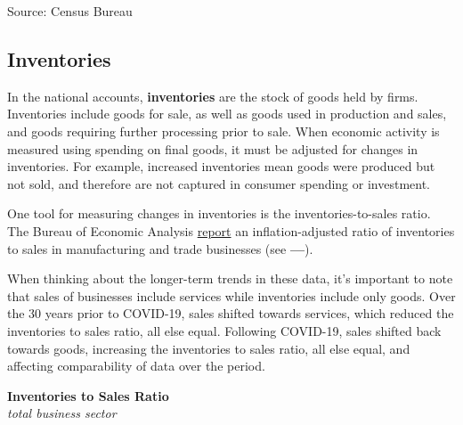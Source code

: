 \documentclass{report}
\makeatletter
\newcommand{\tbllink}[1]{\href{https://raw.githubusercontent.com/bdecon/US-chartbook/master/chartbook/data/#1}{\faTable}}
\newcommand*\short[1]{\expandafter\@gobbletwo\number\numexpr#1\relax}
\newcommand{\shdateaxisticks}{
		date coordinates in=x, axis line style={draw=none},
		xmax={2023-11-01},
		max space between ticks=40,	    
		xtick={{1990-01-01}, {1995-01-01}, {2000-01-01}, 
			{2005-01-01}, {2010-01-01}, {2015-01-01}, {2020-01-01}},
		minor xtick={},
		enlarge y limits={0.06}, enlarge x limits={0.01},
		}
\newcommand{\bbar}[2]{extra #1 ticks = {{#2}}, extra #1 tick labels = ,
		extra #1 tick style = {grid=major, grid style={thick, black!25}},}
\newcommand{\thickline}[4]{\addplot[ultra thick, no markers, color=#1] 
		table [x=#2, y=#3, col sep=comma] {#4};	}
\newcommand{\rebars}{
		\fill[color=black!10] (axis cs:{2007-12-01},\pgfkeysvalueof{/pgfplots/ymin}) rectangle 
			(axis cs:{2009-07-01}, \pgfkeysvalueof{/pgfplots/ymax});
		\fill[color=black!10] (axis cs:{2001-03-01},\pgfkeysvalueof{/pgfplots/ymin}) rectangle 
			(axis cs:{2001-11-01}, \pgfkeysvalueof{/pgfplots/ymax});
		\fill[color=black!10] (axis cs:{2020-02-01},\pgfkeysvalueof{/pgfplots/ymin}) rectangle 
			(axis cs:{2020-05-01}, \pgfkeysvalueof{/pgfplots/ymax});}
\makeatother
\begin{document}
{\begin{minipage}{0.4\textwidth}
\hspace{2mm} 

\footnotesize{Source: Census Bureau} \hfill \tbllink{dgno.csv} \ 
\end{minipage}
\vspace{10mm}

\begin{minipage}{0.76\textwidth}  
\subsection*{Inventories} 
\small In the national accounts, \textbf{inventories} are the stock of goods held by firms. Inventories include goods for sale, as well as goods used in production and sales, and goods requiring further processing prior to sale. When economic activity is measured using spending on final goods, it must be adjusted for changes in inventories. For example, increased inventories mean goods were produced but not sold, and therefore are not captured in consumer spending or investment. 

One tool for measuring changes in inventories is the inventories-to-sales ratio. The Bureau of Economic Analysis \href{https://apps.bea.gov/iTable/index_UD.cfm}{report} an inflation-adjusted ratio of inventories to sales in manufacturing and trade businesses (see {\color{blue!60!green}\textbf{---}}). 

When thinking about the longer-term trends in these data, it's important to note that sales of businesses include services while inventories include only goods. Over the 30 years prior to COVID-19, sales shifted towards services, which reduced the inventories to sales ratio, all else equal. Following COVID-19, sales shifted back towards goods, increasing the inventories to sales ratio, all else equal, and affecting comparability of data over the period. 
\end{minipage}

\begin{minipage}{0.39\textwidth}
\normalsize \textbf{Inventories to Sales Ratio}\\
\footnotesize{\textit{total business sector}}
\vspace{4.1cm}


\end{minipage}}
\end{document}

